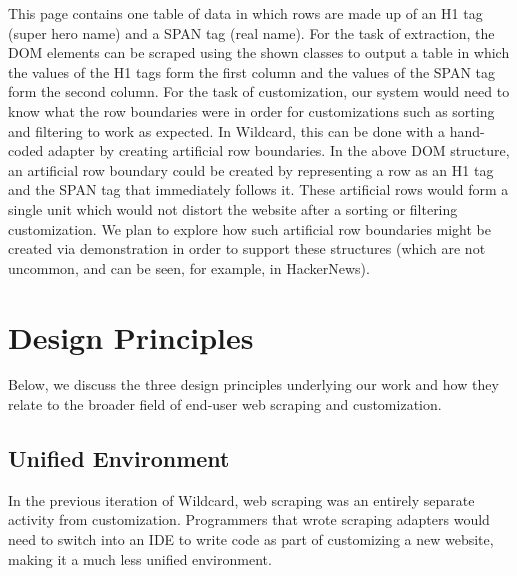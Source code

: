 \documentclass[sigconf,10pt]{acmart}
\begin{document}
This page contains one table of data in which rows are made up of an H1
tag (super hero name) and a SPAN tag (real name). For the task of
extraction, the DOM elements can be scraped using the shown classes to
output a table in which the values of the H1 tags form the first column
and the values of the SPAN tag form the second column. For the task of
customization, our system would need to know what the row boundaries
were in order for customizations such as sorting and filtering to work
as expected. In Wildcard, this can be done with a hand-coded adapter by
creating artificial row boundaries. In the above DOM structure, an
artificial row boundary could be created by representing a row as an H1
tag and the SPAN tag that immediately follows it. These artificial rows
would form a single unit which would not distort the website after a
sorting or filtering customization. We plan to explore how such
artificial row boundaries might be created via demonstration in order to
support these structures (which are not uncommon, and can be seen, for
example, in HackerNews).

\hypertarget{sec:design-principles}{%
\section{Design Principles}\label{sec:design-principles}}

Below, we discuss the three design principles underlying our work and
how they relate to the broader field of end-user web scraping and
customization.

\hypertarget{unified-environment}{%
\subsection{Unified Environment}\label{unified-environment}}

In the previous iteration of Wildcard, web scraping was an entirely
separate activity from customization. Programmers that wrote scraping
adapters would need to switch into an IDE to write code as part of
customizing a new website, making it a much less unified environment.
\end{document}

